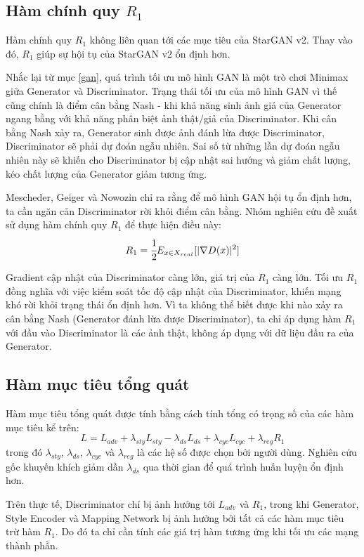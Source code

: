 \documentclass[12pt]{extreport}
\begin{document}
\subsection{Hàm chính quy $ R_1 $}

Hàm chính quy $ R_1 $ không liên quan tới các mục tiêu của StarGAN v2. Thay vào đó, $ R_1 $ giúp sự hội tụ của StarGAN v2 ổn định hơn.

Nhắc lại từ mục \ref{gan}, quá trình tối ưu mô hình GAN là một trò chơi Minimax giữa Generator và Discriminator. Trạng thái tối ưu của mô hình GAN vì thế cũng chính là điểm cân bằng Nash - khi khả năng sinh ảnh giả của Generator ngang bằng với khả năng phân biệt ảnh thật/giả của Discriminator. Khi cân bằng Nash xảy ra, Generator sinh được ảnh đánh lừa được Discriminator, Discriminator sẽ phải dự đoán ngẫu nhiên. Sai số từ những lần dự đoán ngẫu nhiên này sẽ khiến cho Discriminator bị cập nhật sai hướng và giảm chất lượng, kéo chất lượng của Generator giảm tương ứng.

Mescheder, Geiger và Nowozin \cite{DBLP:journals/corr/abs-1801-04406} chỉ ra rằng để mô hình GAN hội tụ ổn định hơn, ta cần ngăn cản Discriminator rời khỏi điểm cân bằng. Nhóm nghiên cứu đề xuất sử dụng hàm chính quy $ R_1 $ để thực hiện điều này:
$$ R_1 = \cfrac{1}{2} E_{x \in X_{real}}[|\nabla D(x)|^2] $$

Gradient cập nhật của Discriminator càng lớn, giá trị của $ R_1 $ càng lớn. Tối ưu $ R_1 $ đồng nghĩa với việc kiểm soát tốc độ cập nhật của Discriminator, khiến mạng khó rời khỏi trạng thái ổn định hơn.  Vì ta không thể biết được khi nào xảy ra cân bằng Nash (Generator đánh lừa được Discriminator), ta chỉ áp dụng hàm $ R_1 $ với đầu vào Discriminator là các ảnh thật, không áp dụng với dữ liệu đầu ra của Generator.

\subsection{Hàm mục tiêu tổng quát}

Hàm mục tiêu tổng quát được tính bằng cách tính tổng có trọng số của các hàm mục tiêu kể trên:
$$ L = L_{adv} + \lambda_{sty} L_{sty} - \lambda_{ds} L_{ds} + \lambda_{cyc} L_{cyc} + \lambda_{reg} R_1  $$
trong đó $ \lambda_{sty} $, $ \lambda_{ds} $, $ \lambda_{cyc} $ và $ \lambda_{reg} $ là các hệ số được chọn bởi người dùng. Nghiên cứu gốc khuyến khích giảm dần $ \lambda_{ds} $ qua thời gian để quá trình huấn luyện ổn định hơn.

Trên thực tế, Discriminator chỉ bị ảnh hưởng tới $ L_{adv} $ và $ R_1 $, trong khi Generator, Style Encoder và Mapping Network bị ảnh hưởng bởi tất cả các hàm mục tiêu trừ hàm $ R_1 $. Do đó ta chỉ cần tính các giá trị hàm tương ứng khi tối ưu các mạng thành phần.
\end{document}
